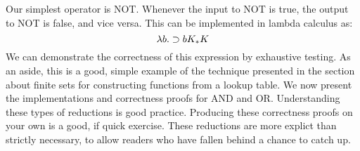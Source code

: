 Our simplest operator is NOT. Whenever the input to NOT is true, the output to NOT is false, and vice versa. This can be implemented in lambda calculus as:
\begin{equation*}
  \lambda b.\supset b K_* K
\end{equation*}
We can demonstrate the correctness of this expression by exhaustive testing. As an aside, this is a good, simple example of the technique presented in the section about finite sets for constructing functions from a lookup table.
We now present the implementations and correctness proofs for AND and OR. Understanding these types of reductions is good practice. Producing these correctness proofs on your own is a good, if quick exercise. These reductions are more explict than strictly necessary, to allow readers who have fallen behind a chance to catch up.
